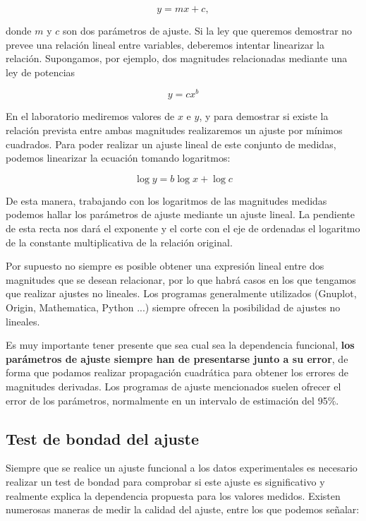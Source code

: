 \documentclass{book}
\begin{document}
\begin{equation}
  y = m x + c ,
\end{equation}

donde $m$ y $c$ son dos parámetros de ajuste. Si la ley que queremos demostrar no prevee una 
relación lineal
entre variables, deberemos intentar linearizar la relación. Supongamos, por ejemplo, dos magnitudes
relacionadas mediante una ley de potencias

\begin{equation}
  y = c x^b
\end{equation}

En el laboratorio mediremos valores de $x$ e $y$, y para demostrar si existe la relación prevista
entre ambas magnitudes realizaremos un ajuste por mínimos cuadrados. Para poder realizar un ajuste
lineal de este conjunto de medidas, podemos linearizar la ecuación tomando logaritmos:

\begin{equation}
  \log{y} = b \log{x} + \log{c}
\end{equation}

De esta manera, trabajando con los logaritmos de las magnitudes medidas podemos hallar los 
parámetros de ajuste mediante un ajuste lineal. La pendiente de esta recta nos dará el exponente
y el corte con el eje de ordenadas el logaritmo de la constante multiplicativa de la relación
original.

Por supuesto no siempre es posible obtener una expresión lineal entre dos magnitudes que se
desean relacionar, por lo que habrá casos en los que tengamos que realizar ajustes no lineales.
Los programas generalmente utilizados (Gnuplot, Origin, Mathematica, Python ...) siempre ofrecen
la posibilidad de ajustes no lineales.

Es muy importante tener presente que sea cual sea la dependencia funcional, \textbf{los parámetros de
ajuste siempre han de presentarse junto a su error}, de forma que podamos realizar propagación
cuadrática para obtener los errores de magnitudes derivadas. Los programas de ajuste mencionados
suelen ofrecer el error de los parámetros, normalmente en un intervalo de estimación del 95\%.


\subsection{Test de bondad del ajuste}

Siempre que se realice un ajuste funcional a los datos experimentales es necesario realizar un
test de bondad para comprobar si este ajuste es significativo y realmente explica la dependencia
propuesta para los valores medidos. Existen numerosas maneras de medir la calidad del ajuste, entre
los que podemos señalar:
\end{document}
